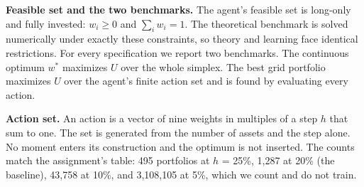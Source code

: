 \documentclass[
  11pt]{article}
\begin{document}
\textbf{Feasible set and the two benchmarks.} The agent's feasible set
is long-only and fully invested: \(w_i \ge 0\) and \(\sum_i w_i = 1\).
The theoretical benchmark is solved numerically under exactly these
constraints, so theory and learning face identical restrictions. For
every specification we report two benchmarks. The continuous optimum
\(w^*\) maximizes \(U\) over the whole simplex. The best grid portfolio
maximizes \(U\) over the agent's finite action set and is found by
evaluating every action.

\textbf{Action set.} An action is a vector of nine weights in multiples
of a step \(h\) that sum to one. The set is generated from the number of
assets and the step alone. No moment enters its construction and the
optimum is not inserted. The counts match the assignment's table: 495
portfolios at \(h\) = 25\%, 1,287 at 20\% (the baseline), 43,758 at
10\%, and 3,108,105 at 5\%, which we count and do not train.
\end{document}
